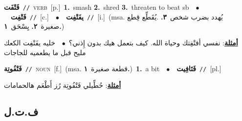 \documentclass[10pt,a4paper,twoside]{article} %
\begin{document}
\begin{multicols}{2}
{\setlength\topsep{0pt}\textbf{\foreignlanguage{arabic}{فَتْفَت}}\ {\color{gray}\texttt{//}\color{black}}\ \textsc{verb}\ [p.]\ \textbf{1.}~smash  \textbf{2.}~shred  \textbf{3.}~threaten to beat sb\ \ $\bullet$\ \ \setlength\topsep{0pt}\textbf{\foreignlanguage{arabic}{فَتْفِت}}\ {\color{gray}\texttt{//}\color{black}}\ [c.]\ \ $\bullet$\ \ \setlength\topsep{0pt}\textbf{\foreignlanguage{arabic}{يفَتْفِت}}\ {\color{gray}\texttt{//}\color{black}}\ [i.]\ \color{gray}(msa. \foreignlanguage{arabic}{يُهدد بضرب شخص}~\foreignlanguage{arabic}{\textbf{٣.}}  .\foreignlanguage{arabic}{يُقَطِّع قِطع صغيرة}~\foreignlanguage{arabic}{\textbf{٢.}}  \foreignlanguage{arabic}{يِسْحَق}~\foreignlanguage{arabic}{\textbf{١.}})\color{black}\  \begin{flushright}\color{gray}\foreignlanguage{arabic}{\textbf{\underline{\foreignlanguage{arabic}{أمثلة}}}: نفسي أفتْفِتك وحياة الله. كيف بتعمل هيك بدون إِذني؟\ $\bullet$\ \  خليه يفَتْفِت الكعك مليح قبل ما يطعميه للجاجات}\end{flushright}\color{black}} \vspace{2mm}

{\setlength\topsep{0pt}\textbf{\foreignlanguage{arabic}{فَتْفُوتِة}}\ {\color{gray}\texttt{//}\color{black}}\ \textsc{noun}\ [f.]\ \color{gray}(msa. \foreignlanguage{arabic}{قطعة صغيرة}~\foreignlanguage{arabic}{\textbf{١.}})\color{black}\ \textbf{1.}~a bit\ \ $\bullet$\ \ \setlength\topsep{0pt}\textbf{\foreignlanguage{arabic}{فَتَافِيت}}\ {\color{gray}\texttt{//}\color{black}}\ [pl.]\  \begin{flushright}\color{gray}\foreignlanguage{arabic}{\textbf{\underline{\foreignlanguage{arabic}{أمثلة}}}: حُطِّيلي فَتْفُوتِة رُز أَطْعَم هالحمامات}\end{flushright}\color{black}} \vspace{2mm}

\vspace{-3mm}
\subsection*{\color{blue}\foreignlanguage{arabic}{ف.ت.ل}\color{blue}{}} 


\end{multicols}
\end{document}
